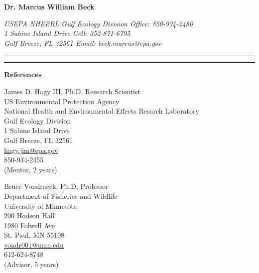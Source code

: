 \documentclass[letterpaper,12pt]{article}
\newcommand{\sectitle}[1]{\vspace{\baselineskip} \centerline{\large{{\bf #1}}}}
\begin{document}
\LARGE
\centerline{{\bf Dr. Marcus William Beck}}
\normalsize
\textit{USEPA NHEERL Gulf Ecology Division \hfill Office: 850-934-2480 \\
1 Sabine Island Drive \hfill Cell: 352-871-6795 \\
Gulf Breeze, FL 32561 \hfill Email: beck.marcus@epa.gov}
\vspace{4pt}
\hrule
\vspace{2pt}
\hrule
\vspace{4pt}


\sectitle{References}

\centering
James D. Hagy III, Ph.D, Research Scientist  \\ 
US Environmental Protection Agency \\
National Health and Environmental Effects Resarch Laboratory \\
Gulf Ecology Division \\
1 Sabine Island Drive \\
Gulf Breeze, FL 32561 \\
\href{mailto:hagy.jim@epa.gov}{hagy.jim@epa.gov} \\
850-934-2455 \\
(Mentor, 2 years) \\
\vspace{\baselineskip}

Bruce Vondracek, Ph.D, Professor \\ 
Department of Fisheries and Wildlife \\
University of Minnesota \\
200 Hodson Hall \\
1980 Folwell Ave \\
St. Paul, MN 55108 \\
\href{mailto:vondr001@umn.edu}{vondr001@umn.edu} \\
612-624-8748 \\
(Advisor, 5 years) \\
\vspace{\baselineskip}
\end{document}
